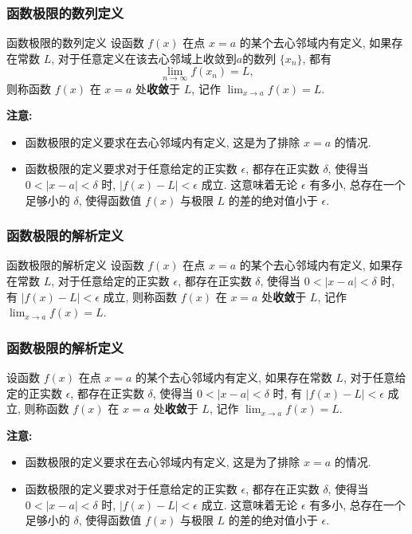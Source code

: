 \documentclass[
10pt, 
aspectratio=43, 
]{beamer}
\begin{document}
\begin{frame}
\frametitle{函数极限的数列定义}
\begin{block}{函数极限的数列定义}
	设函数 $f(x)$ 在点 $x=a$ 的某个去心邻域内有定义, 如果存在常数 $L$, 对于任意定义在该去心邻域上收敛到$a$的数列 $\{x_n\}$, 都有 
 \begin{equation*}
\lim_{n\to\infty} f(x_n) = L, 
 \end{equation*}
 则称函数 $f(x)$ 在 $x=a$ 处\textbf{收敛}于 $L$, 记作 $\lim_{x \to a} f(x) = L$. 
\end{block}

\pause

\textbf{注意: }
\begin{itemize}
\item 函数极限的定义要求在去心邻域内有定义, 这是为了排除 $x=a$ 的情况. 
\pause
\item 函数极限的定义要求对于任意给定的正实数 $\epsilon$, 都存在正实数 $\delta$, 使得当 $0 < |x-a| < \delta$ 时, $|f(x) - L| < \epsilon$ 成立. 这意味着无论 $\epsilon$ 有多小, 总存在一个足够小的 $\delta$, 使得函数值 $f(x)$ 与极限 $L$ 的差的绝对值小于 $\epsilon$. 
\end{itemize}

\end{frame}

\begin{frame}
\frametitle{函数极限的解析定义}
\begin{block}{函数极限的解析定义}
	设函数 $f(x)$ 在点 $x=a$ 的某个去心邻域内有定义, 如果存在常数 $L$, 对于任意给定的正实数 $\epsilon$, 都存在正实数 $\delta$, 使得当 $0 < |x-a| < \delta$ 时, 有 $|f(x) - L| < \epsilon$ 成立, 则称函数 $f(x)$ 在 $x=a$ 处\textbf{收敛}于 $L$, 记作 $\lim_{x \to a} f(x) = L$. 
\end{block}
\end{frame}


\begin{frame}
\frametitle{函数极限的解析定义}

设函数 $f(x)$ 在点 $x=a$ 的某个去心邻域内有定义, 如果存在常数 $L$, 对于任意给定的正实数 $\epsilon$, 都存在正实数 $\delta$, 使得当 $0 < |x-a| < \delta$ 时, 有 $|f(x) - L| < \epsilon$ 成立, 则称函数 $f(x)$ 在 $x=a$ 处\textbf{收敛}于 $L$, 记作 $\lim_{x \to a} f(x) = L$. 

\pause

\textbf{注意: }
\begin{itemize}
\item 函数极限的定义要求在去心邻域内有定义, 这是为了排除 $x=a$ 的情况. 
\pause
\item 函数极限的定义要求对于任意给定的正实数 $\epsilon$, 都存在正实数 $\delta$, 使得当 $0 < |x-a| < \delta$ 时, $|f(x) - L| < \epsilon$ 成立. 这意味着无论 $\epsilon$ 有多小, 总存在一个足够小的 $\delta$, 使得函数值 $f(x)$ 与极限 $L$ 的差的绝对值小于 $\epsilon$. 
\end{itemize}

\end{frame}
\end{document}
